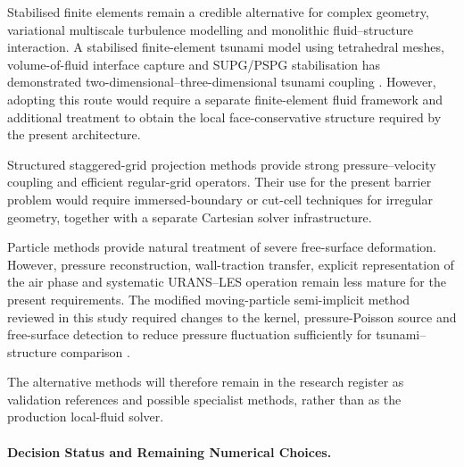 Stabilised finite elements remain a credible alternative for complex
geometry, variational multiscale turbulence modelling and monolithic
fluid--structure interaction. A stabilised finite-element tsunami model
using tetrahedral meshes, volume-of-fluid interface capture and
SUPG/PSPG stabilisation has demonstrated
two-dimensional--three-dimensional tsunami coupling
\parencite{takase2016hybrid}. However, adopting this route would require
a separate finite-element fluid framework and additional treatment to
obtain the local face-conservative structure required by the present
architecture.

Structured staggered-grid projection methods provide strong
pressure--velocity coupling and efficient regular-grid operators. Their
use for the present barrier problem would require immersed-boundary or
cut-cell techniques for irregular geometry, together with a separate
Cartesian solver infrastructure.

Particle methods provide natural treatment of severe free-surface
deformation. However, pressure reconstruction, wall-traction transfer,
explicit representation of the air phase and systematic URANS--LES
operation remain less mature for the present requirements. The modified
moving-particle semi-implicit method reviewed in this study required
changes to the kernel, pressure-Poisson source and free-surface
detection to reduce pressure fluctuation sufficiently for
tsunami--structure comparison \parencite{huang2015modifiedmps}.

The alternative methods will therefore remain in the research register
as validation references and possible specialist methods, rather than as
the production local-fluid solver.

\paragraph{Decision Status and Remaining Numerical Choices.}
\label{sec:num-local-three-dimensional-decision-status}

